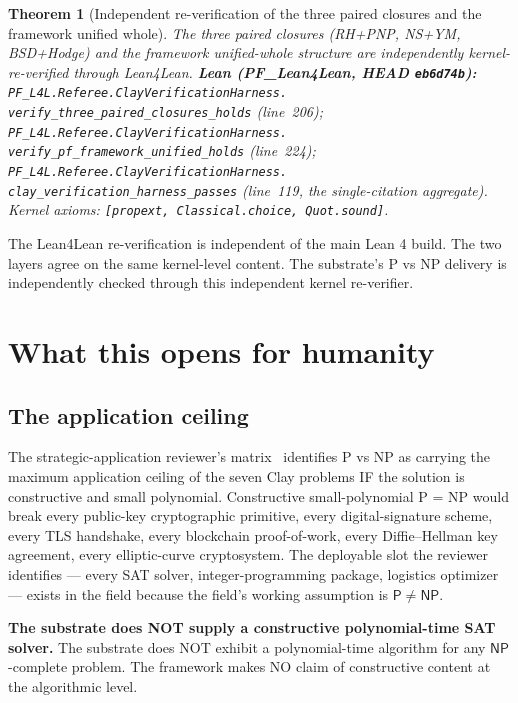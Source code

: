 \documentclass[11pt,a4paper]{article}
\theoremstyle{plain}
\newtheorem{theorem}{Theorem}[section]
\theoremstyle{definition}
\begin{document}
\begin{theorem}[Independent re-verification of the three paired
closures and the framework unified whole]
\label{thm:l4l-paired-unified}
The three paired closures (RH+PNP, NS+YM, BSD+Hodge) and the
framework unified-whole structure are independently kernel-re-verified
through Lean4Lean.
\textbf{Lean (PF\_Lean4Lean, HEAD \texttt{eb6d74b}):}
\texttt{PF\_L4L.Referee.ClayVerificationHarness.\\
verify\_three\_paired\_closures\_holds}
(line~206);
\texttt{PF\_L4L.Referee.ClayVerificationHarness.\\
verify\_pf\_framework\_unified\_holds}
(line~224);
\texttt{PF\_L4L.Referee.ClayVerificationHarness.\\
clay\_verification\_harness\_passes}
(line~119, the single-citation aggregate). Kernel axioms:
\texttt{[propext, Classical.choice, Quot.sound]}.
\end{theorem}

The Lean4Lean re-verification is independent of the main Lean 4
build. The two layers agree on the same kernel-level content. The
substrate's P vs NP delivery is independently checked through this
independent kernel re-verifier.

\section{What this opens for humanity}
\label{sec:what-opens}

\subsection{The application ceiling}
\label{sec:application-ceiling}

The strategic-application reviewer's matrix~\cite{landing_strategy}
identifies P vs NP as carrying the maximum application ceiling of the
seven Clay problems IF the solution is constructive and small
polynomial. Constructive small-polynomial P = NP would break every
public-key cryptographic primitive, every digital-signature scheme,
every TLS handshake, every blockchain proof-of-work, every Diffie--Hellman
key agreement, every elliptic-curve cryptosystem. The deployable slot
the reviewer identifies --- every SAT solver, integer-programming
package, logistics optimizer --- exists in the field because the
field's working assumption is $\mathsf{P} \neq \mathsf{NP}$.

\textbf{The substrate does NOT supply a constructive polynomial-time
SAT solver.} The substrate does NOT exhibit a polynomial-time
algorithm for any $\mathsf{NP}$-complete problem. The framework makes
NO claim of constructive content at the algorithmic level.
\end{document}

